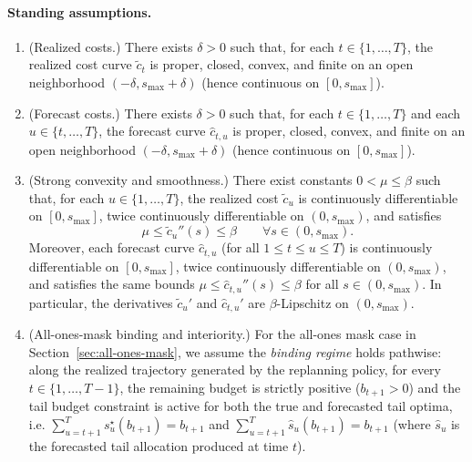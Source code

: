 \documentclass[11pt]{article}
\newenvironment{assumptions}{%
  \begingroup
  \renewcommand{\labelenumi}{\textbf{A\arabic{enumi}}.}%
  \renewcommand{\theenumi}{A\arabic{enumi}}%
  \begin{enumerate}
    }{%
  \end{enumerate}
  \endgroup
}
\newcommand{\1}{\mathbf{1}}
\begin{document}
\paragraph{Standing assumptions.}
\begin{assumptions}
\item\label{ass:A1} (Realized costs.) There exists $\delta>0$ such that, for each $t \in \{1,\dots,T\}$, the realized cost curve $\tilde{c}_t$ is proper, closed, convex, and finite on an open neighborhood $(-\delta,s_{\max}+\delta)$ (hence continuous on $[0,s_{\max}]$).
\item\label{ass:A2} (Forecast costs.) There exists $\delta>0$ such that, for each $t \in \{1,\dots,T\}$ and each $u \in \{t,\dots,T\}$, the forecast curve $\hat{c}_{t,u}$ is proper, closed, convex, and finite on an open neighborhood $(-\delta,s_{\max}+\delta)$ (hence continuous on $[0,s_{\max}]$).
\item\label{ass:A3} (Strong convexity and smoothness.) There exist constants $0 < \mu \leq \beta$ such that, for each $u \in \{1,\dots,T\}$, the realized cost $\tilde{c}_u$ is continuously differentiable on $[0,s_{\max}]$, twice continuously differentiable on $(0,s_{\max})$, and satisfies
  \begin{equation}
    \label{eq:mu-beta-assumptions}
    \mu \leq \tilde{c}_u''(s) \leq \beta
    \qquad \forall s \in (0,s_{\max}).
  \end{equation}
  Moreover, each forecast curve $\hat{c}_{t,u}$ (for all $1 \leq t \leq u \leq T$) is continuously differentiable on $[0,s_{\max}]$, twice continuously differentiable on $(0,s_{\max})$, and satisfies the same bounds $\mu \leq \hat{c}_{t,u}''(s) \leq \beta$ for all $s \in (0,s_{\max})$. In particular, the derivatives $\tilde{c}_u'$ and $\hat{c}_{t,u}'$ are $\beta$-Lipschitz on $(0,s_{\max})$.
\item\label{ass:A4} (All-ones-mask binding and interiority.)
  For the all-ones mask case in Section~\ref{sec:all-ones-mask}, we assume the \emph{binding regime} holds pathwise:
  along the realized trajectory generated by the replanning policy, for every $t \in \{1,\dots,T-1\}$, the remaining budget is strictly positive ($b_{t+1} > 0$) and the tail budget constraint is active for both the true and forecasted tail optima,
  i.e. $\sum_{u=t+1}^{T} s_u^{\star}(b_{t+1})=b_{t+1}$ and $\sum_{u=t+1}^{T} \hat{s}_u(b_{t+1})=b_{t+1}$ (where $\hat{s}_u$ is the forecasted tail allocation produced at time $t$).


\end{assumptions}
\end{document}
